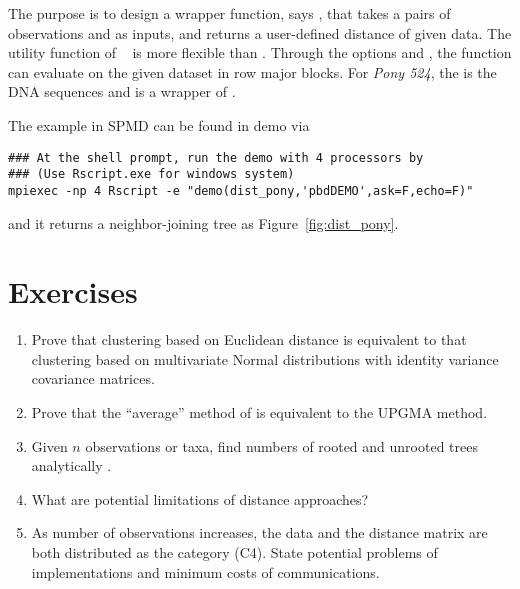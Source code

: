 The purpose is to design a wrapper function, says ,
that takes a pairs of observations  and  as inputs, and
returns a user-defined distance of given data.
The utility function 
of ~\citep{Chen2012pbdMPIpackage}
is more flexible than .
Through the options  and , the
function can evaluate  on the given dataset  in
row major blocks.
For {\it Pony 524}, the  is the DNA sequences and 
is a wrapper of .

The example in SPMD can be found in demo via
\begin{lstlisting}
### At the shell prompt, run the demo with 4 processors by
### (Use Rscript.exe for windows system)
mpiexec -np 4 Rscript -e "demo(dist_pony,'pbdDEMO',ask=F,echo=F)"
\end{lstlisting}
and it returns a neighbor-joining tree as Figure~\ref{fig:dist_pony}.



\section{Exercises}
\label{sec:pairwise_exercise}

\begin{enumerate}[label=\thechapter-\arabic*]

\item
Prove that clustering based on Euclidean distance is equivalent to that
clustering based on multivariate Normal distributions with identity variance
covariance matrices.

\item
Prove that the ``average'' method of  is equivalent to the
UPGMA method.

\item
Given $n$ observations or taxa, find numbers of rooted and unrooted trees
analytically .

\item
What are potential limitations of distance approaches?

\item
As number of observations increases, the data and the distance matrix are
both distributed as the category (C4). State potential problems of
implementations and minimum costs of communications.

\end{enumerate}

